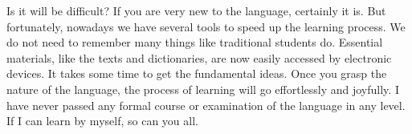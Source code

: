 Is it will be difficult? If you are very new to the language, certainly it is. But fortunately, nowadays we have several tools to speed up the learning process. We do not need to remember many things like traditional students do. Essential materials, like the texts and dictionaries, are now easily accessed by electronic devices. It takes some time to get the fundamental ideas. Once you grasp the nature of the language, the process of learning will go effortlessly and joyfully. I have never passed any formal course or examination of the language in any level. If I can learn by myself, so can you all.
